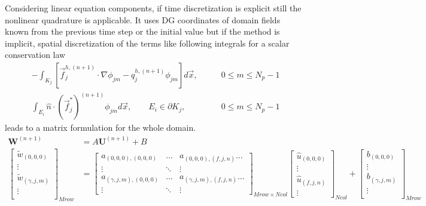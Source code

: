 \documentclass[BoSSSForSolvingConservationLaws.tex]{subfiles}
\begin{document}
Considering linear equation components, if time discretization is explicit still the nonlinear quadrature is applicable. It uses DG coordinates of domain fields known from the previous time step or the initial value but if the method is implicit, spatial discretization of the terms like following integrals for a scalar conservation law
\begin{align}
\label{VolumeIntegral-Implicit}
-\int_{K_j} [\vec{f}_j^{h,(n+1)}\cdot \nabla \phi_{jm} - q_j^{h,(n+1)} \phi_{jm}] d\vec{x},&\qquad 0\leq m \leq N_p-1\\
\label{EdgeIntegral-Implicit}
\int_{E_i} \hat{n}\cdot (\vec{f}_j^*)^{(n+1)} \phi_{jm} d\vec{x}, \qquad E_i \in \partial K_j,&\qquad 0\leq m \leq N_p-1
\end{align}
leads to a matrix formulation for the whole domain.
\begin{align*}
\textbf{W}^{(n+1)}&=A\textbf{U}^{(n+1)}+B\\
\label{LinearQuadrature-MatrixForm}
\begin{bmatrix}
\tilde{w}_{(0,0,0)}\\
\vdots\\
\tilde{w}_{(\gamma,j,m)}\\
\vdots\\
\end{bmatrix}_{Mrow}&=
\begin{bmatrix}
a_{(0,0,0),(0,0,0)} & \dots  & a_{(0,0,0),(f,j,n)} \dots \\
\vdots              & \ddots & \vdots\\
a_{(\gamma,j,m),(0,0,0)} &  \dots & a_{(\gamma,j,m),(f,j,n)} \dots\\
\vdots & \ddots & \vdots
\end{bmatrix}_{Mrow\times Ncol}
\begin{bmatrix}
\hat{u}_{(0,0,0)}\\
\vdots\\
\hat{u}_{(f,j,n)}\\
\vdots
\end{bmatrix}_{Ncol}+
\begin{bmatrix}
b_{(0,0,0)}\\
\vdots\\
b_{(\gamma,j,m)}\\
\vdots\\
\end{bmatrix}_{Mrow}
\end{align*}
\end{document}
